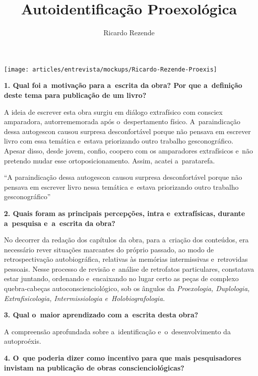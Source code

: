 \documentclass{gescons}
\author{Ricardo Rezende}
\title{Autoidentificação Proexológica}
\begin{document}
    \makeentrevistatitle

    \begin{multicols}{2}


\begin{center}
    \texttt{[image: articles/entrevista/mockups/Ricardo-Rezende-Proexis]}
\end{center}

\textbf{1. Qual foi a~motivação para a~escrita da obra? Por que a~definição deste tema para publicação de um livro? }

A ideia de escrever esta obra surgiu em diálogo extrafísico com consciex amparadora, autorrememorada após o~despertamento físico. A~paraindicação dessa autogescon causou surpresa desconfortável porque não pensava em escrever livro com essa temática e~estava priorizando outro trabalho gesconográfico. Apesar disso, desde jovem, confio, coopero com os amparadores extrafísicos e~não pretendo mudar esse ortoposicionamento. Assim, acatei a~paratarefa.

\begin{pullquote}
    ``A paraindicação dessa autogescon causou surpresa desconfortável porque não pensava em escrever livro nessa temática e~estava priorizando outro trabalho gesconográfico''
\end{pullquote}

\textbf{2. Quais foram as principais percepções, intra e~extrafísicas, durante a~pesquisa e~a~escrita da obra? }

No decorrer da redação dos capítulos da obra, para a~criação dos conteúdos, era necessário rever situações marcantes do próprio passado, ao modo de retrospectivação autobiográfica, relativas às memórias intermissivas e~retrovidas pessoais. Nesse processo de revisão e~análise de retrofatos particulares, constatava estar juntando, ordenando e~encaixando no lugar certo as peças de complexo quebra-cabeças autoconscienciológico, sob os ângulos da \textit{Proexologia, Duplologia, Extrafisicologia, Intermissiologia e~Holobiografologia.}

\textbf{3. Qual o~maior aprendizado com a~escrita desta obra? }

A compreensão aprofundada sobre a~identificação e~o~desenvolvimento da autoproéxis.

\textbf{4. O~que poderia dizer como incentivo para que mais pesquisadores invistam na publicação de obras conscienciológicas?}


\end{multicols}
\end{document}
